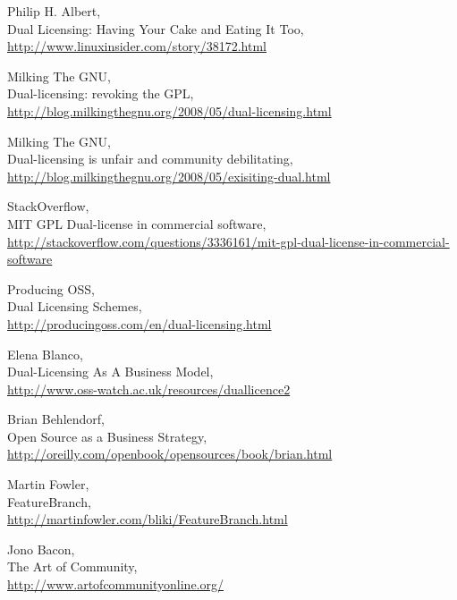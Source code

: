 \documentclass[11pt]{scrartcl}
\begin{document}
\begin{thebibliography}{9}

    Philip H. Albert,\\
    Dual Licensing: Having Your Cake and Eating It Too,\\
    \url{http://www.linuxinsider.com/story/38172.html}

    Milking The GNU,\\
    Dual-licensing: revoking the GPL,\\
    \url{http://blog.milkingthegnu.org/2008/05/dual-licensing.html}

    Milking The GNU,\\
    Dual-licensing is unfair and community debilitating,\\
    \url{http://blog.milkingthegnu.org/2008/05/exisiting-dual.html}

    StackOverflow,\\
    MIT GPL Dual-license in commercial software,\\
    \url{http://stackoverflow.com/questions/3336161/mit-gpl-dual-license-in-commercial-software}

    Producing OSS,\\
    Dual Licensing Schemes,\\
    \url{http://producingoss.com/en/dual-licensing.html}

    Elena Blanco,\\
    Dual-Licensing As A Business Model,\\
    \url{http://www.oss-watch.ac.uk/resources/duallicence2}

    Brian Behlendorf,\\
    Open Source as a Business Strategy,\\
    \url{http://oreilly.com/openbook/opensources/book/brian.html}
    
    Martin Fowler,\\
    FeatureBranch,\\
    \url{http://martinfowler.com/bliki/FeatureBranch.html}
    
    Jono Bacon,\\
    The Art of Community,\\
    \url{http://www.artofcommunityonline.org/}


\end{thebibliography}
\end{document}
